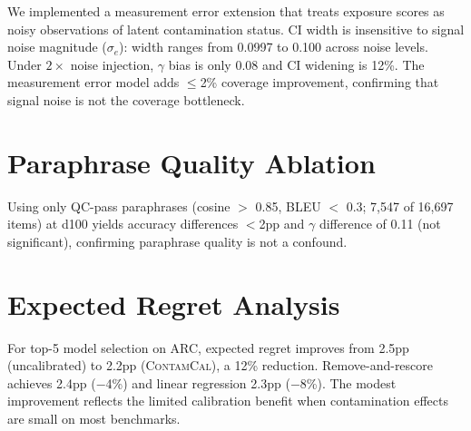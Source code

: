 \documentclass[11pt,a4paper]{article}
\newcommand{\contamcal}{\textsc{ContamCal}}
\begin{document}
We implemented a measurement error extension that treats exposure scores as noisy observations of latent contamination status. CI width is insensitive to signal noise magnitude ($\sigma_e$): width ranges from 0.0997 to 0.100 across noise levels. Under $2\times$ noise injection, $\gamma$ bias is only 0.08 and CI widening is 12\%. The measurement error model adds $\leq$2\% coverage improvement, confirming that signal noise is not the coverage bottleneck.

\section{Paraphrase Quality Ablation}
\label{app:qc}

Using only QC-pass paraphrases (cosine $>$ 0.85, BLEU $<$ 0.3; 7,547 of 16,697 items) at d100 yields accuracy differences $<$2pp and $\gamma$ difference of 0.11 (not significant), confirming paraphrase quality is not a confound.

\section{Expected Regret Analysis}
\label{app:regret}

For top-5 model selection on ARC, expected regret improves from 2.5pp (uncalibrated) to 2.2pp (\contamcal{}), a 12\% reduction. Remove-and-rescore achieves 2.4pp ($-$4\%) and linear regression 2.3pp ($-$8\%). The modest improvement reflects the limited calibration benefit when contamination effects are small on most benchmarks.
\end{document}
